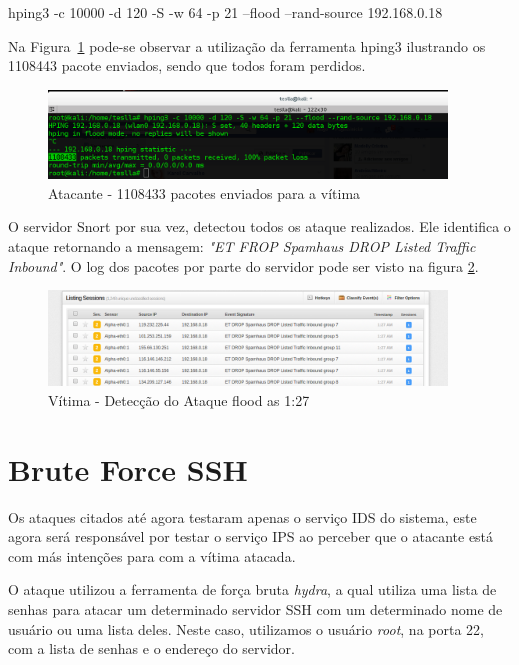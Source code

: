 \begin{framed}
	hping3 -c 10000 -d 120 -S -w 64 -p 21 --flood --rand-source 192.168.0.18
\end{framed}

	Na Figura~\ref{fig:atacante_hping3} pode-se observar a utilização da ferramenta hping3 ilustrando
	os 1108443 pacote enviados, sendo que todos foram perdidos.

	 \begin{figure}[h]
 	 \centering
 	 \includegraphics[width=400px, scale=1]{resource/atacante_hping3}
 	 \caption{Atacante - 1108433 pacotes enviados para a vítima}
  \label{fig:atacante_hping3}
  \end{figure}

	O servidor Snort por sua vez, detectou todos os ataque realizados. Ele identifica
	o ataque retornando a mensagem: \emph{"ET FROP Spamhaus DROP Listed Traffic Inbound"}. O
	log dos pacotes por parte do servidor pode ser visto na figura \ref{fig:vitima_flood}.

	 \begin{figure}[h]
 	 \centering
 	 \includegraphics[width=400px, scale=1]{resource/vitima_flood}
 	 \caption{Vítima - Detecção do Ataque flood as 1:27}
  \label{fig:vitima_flood}
  \end{figure}

\section{Brute Force SSH}
\label{sec:Brute_Force_SSH}
	Os ataques citados até agora testaram apenas o serviço IDS do sistema, este agora
	será responsável por testar o serviço IPS ao perceber que o atacante está com más
	intenções para com a vítima atacada.

	O ataque utilizou a ferramenta de força bruta \emph{hydra}, a qual utiliza uma lista
	de senhas para atacar um determinado servidor SSH com um determinado nome de
	usuário ou uma lista deles. Neste caso, utilizamos o usuário \emph{root}, na porta 22,
	com a lista de senhas e o endereço do servidor.


